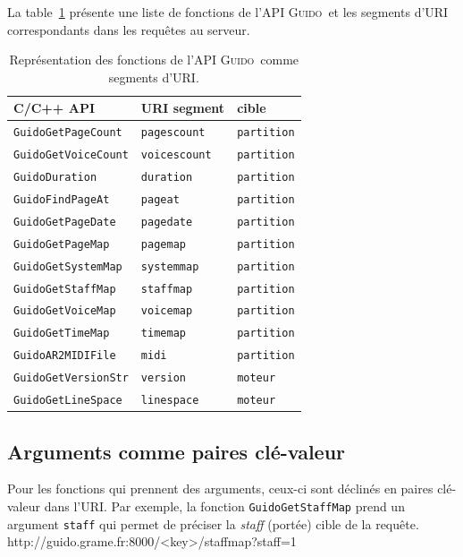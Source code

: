 \documentclass{article}
\newenvironment{code}		{\vspace{-2mm} \fontsize{8.5pt}{12pt}\selectfont \verbatim}{\endverbatim\vspace{-2mm}}
\newcommand{\guido}		{\textsc{Guido}}
\begin{document}
La table~\ref{table:table1} présente une liste de fonctions de l'API \guido\ et les segments d'URI correspondants dans les requêtes au serveur.
\begin{table}
\centering
{\small \begin{tabular}{|l|l|l|}\hline
C/C++ API & URI segment & cible \\\hline
\verb=GuidoGetPageCount= & \verb=pagescount= & \verb=partition= \\\hline
\verb=GuidoGetVoiceCount= & \verb=voicescount= & \verb=partition= \\\hline
\verb=GuidoDuration= & \verb=duration= & \verb=partition= \\\hline
\verb=GuidoFindPageAt= & \verb=pageat= & \verb=partition= \\\hline
\verb=GuidoGetPageDate= & \verb=pagedate= & \verb=partition= \\\hline
\verb=GuidoGetPageMap= & \verb=pagemap= & \verb=partition= \\\hline
\verb=GuidoGetSystemMap= & \verb=systemmap= & \verb=partition= \\\hline
\verb=GuidoGetStaffMap= & \verb=staffmap= & \verb=partition= \\\hline
\verb=GuidoGetVoiceMap= & \verb=voicemap= & \verb=partition= \\\hline
\verb=GuidoGetTimeMap= & \verb=timemap= & \verb=partition= \\\hline
\verb=GuidoAR2MIDIFile= & \verb=midi= & \verb=partition= \\\hline
\verb=GuidoGetVersionStr= & \verb=version= & \verb=moteur= \\\hline
\verb=GuidoGetLineSpace= & \verb=linespace= & \verb=moteur= \\\hline
\end{tabular}
}
\cprotect\caption{\label{table:table1} Représentation des fonctions de l'API \guido\ comme segments d'URI.}
\end{table}


\subsection{Arguments comme paires clé-valeur}
Pour les fonctions qui prennent des arguments, ceux-ci sont déclinés en paires clé-valeur dans l'URI. Par exemple, la fonction \verb=GuidoGetStaffMap= prend un argument \verb=staff= qui permet de préciser la \emph{staff} (portée) cible de la requête.
\begin{code}
 http://guido.grame.fr:8000/<key>/staffmap?staff=1
\end{code}
\end{document}
